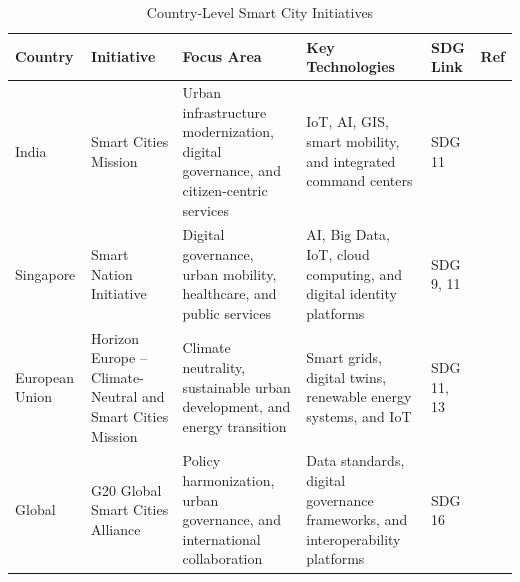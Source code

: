 \documentclass[pdflatex,sn-mathphys-num]{sn-jnl}%
\theoremstyle{thmstyleone}%
\theoremstyle{thmstyletwo}%
\theoremstyle{thmstylethree}%
\begin{document}
\begin{table}[!t]
\caption{Country-Level Smart City Initiatives}
\label{tab:country}
\centering
\scriptsize
\setlength{\tabcolsep}{4pt}
\renewcommand{\arraystretch}{1.15}

\begin{tabularx}{\textwidth}{|
>{\raggedright\arraybackslash}p{}|
>{\raggedright\arraybackslash}X|
>{\raggedright\arraybackslash}p{}|
>{\raggedright\arraybackslash}p{}|
>{\centering\arraybackslash}p{}|
>{\centering\arraybackslash}p{}|}
\hline

\textbf{Country} &
\textbf{Initiative} &
\textbf{Focus Area} &
\textbf{Key Technologies} &
\textbf{SDG Link} &
\textbf{Ref} \\
\hline

India &
Smart Cities Mission &
Urban infrastructure modernization, digital governance, and citizen-centric services &
IoT, AI, GIS, smart mobility, and integrated command centers &
SDG 11 &
[120] \\
\hline

Singapore &
Smart Nation Initiative &
Digital governance, urban mobility, healthcare, and public services &
AI, Big Data, IoT, cloud computing, and digital identity platforms &
SDG 9, 11 &
[121] \\
\hline

European Union &
Horizon Europe -- Climate-Neutral and Smart Cities Mission &
Climate neutrality, sustainable urban development, and energy transition &
Smart grids, digital twins, renewable energy systems, and IoT &
SDG 11, 13 &
[122] \\
\hline

Global &
G20 Global Smart Cities Alliance &
Policy harmonization, urban governance, and international collaboration &
Data standards, digital governance frameworks, and interoperability platforms &
SDG 16 &
[123] \\
\hline

\end{tabularx}
\end{table}
\end{document}
